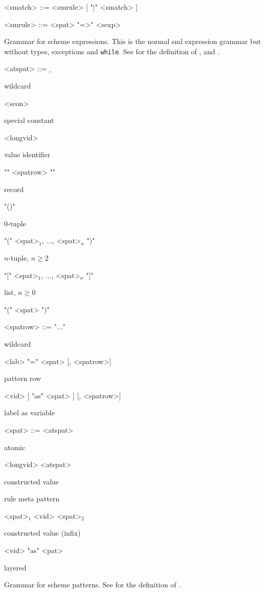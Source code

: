 \begin{nonfloatingtable}
\begin{grammar}
  <smatch> ::= <smrule> [ "|" <smatch> ]
  
  <smrule> ::= <spat> "=>" <sexp>
\end{grammar}

  \caption{Grammar for scheme expressions. This is the normal sml expression
    grammar but without types, exceptions and \texttt{while}.  See  for
    the definition of ,  and .}
  \label{tab:scheme-expressions}
\end{nonfloatingtable}


\begin{nonfloatingtable}

\setlength{\grammarindent}{7em}

\newcommand{\cmt}[1]{\parbox{8em}{\small{#1}}}

\begin{grammar}
  <atspat> ::= $\_$                              \hfill \cmt{wildcard}
  \alt <scon>                                    \hfill \cmt{special constant}
  \alt ["op"] <longvid>                          \hfill \cmt{value identifier}
  \alt "{" <spatrow> "}"                         \hfill \cmt{record}
  \alt "()"                                      \hfill \cmt{$0$-tuple}
  \alt "(" <spat>$_1$, $\ldots$, <spat>$_n$ ")"  \hfill \cmt{$n$-tuple, $n \geq  2$}
  \alt "[" <spat>$_1$, $\ldots$, <spat>$_n$ "]"  \hfill \cmt{list, $n \geq 0$}
  \alt "(" <spat> ")" 

  <spatrow> ::= "..."                      \hfill \cmt{wildcard}
  \alt <lab> "=" <spat> [, <spatrow>]      \hfill \cmt{pattern row}
  \alt <vid> [ "as" <spat> ] [, <spatrow>] \hfill \cmt{label as variable}

  <spat> ::= <atspat>                      \hfill \cmt{atomic}
  \alt ["op"] <longvid> <atspat>           \hfill \cmt{constructed value}
                   \hfill \cmt{rule meta pattern}
  \alt <spat>$_1$ <vid> <spat>$_2$         \hfill \cmt{constructed value (infix)}
  \alt ["op"] <vid> "as" <pat>             \hfill \cmt{layered}
\end{grammar}
  
  \caption{Grammar for scheme patterns. See  for
    the definition of .}
  \label{tab:scheme-patterns}
\end{nonfloatingtable}


